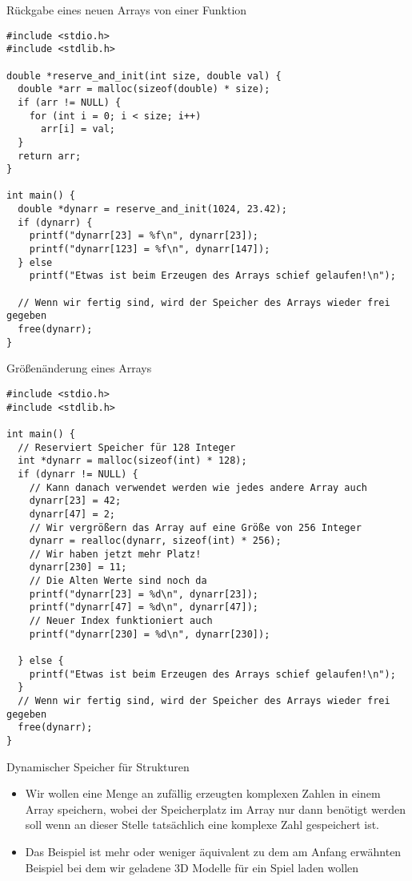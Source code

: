 \documentclass[presentation]{beamer}
\begin{document}
\begin{frame}[label={sec:orgfb5cda6},fragile]{Rückgabe eines neuen Arrays von einer Funktion}
 \begin{verbatim}
#include <stdio.h>
#include <stdlib.h>

double *reserve_and_init(int size, double val) {
  double *arr = malloc(sizeof(double) * size);
  if (arr != NULL) {
    for (int i = 0; i < size; i++)
      arr[i] = val;
  }
  return arr;
}

int main() {
  double *dynarr = reserve_and_init(1024, 23.42);
  if (dynarr) {
    printf("dynarr[23] = %f\n", dynarr[23]);
    printf("dynarr[123] = %f\n", dynarr[147]);
  } else
    printf("Etwas ist beim Erzeugen des Arrays schief gelaufen!\n");

  // Wenn wir fertig sind, wird der Speicher des Arrays wieder frei gegeben
  free(dynarr);
}
\end{verbatim}
\end{frame}

\begin{frame}[label={sec:orga4131c1},fragile]{Größenänderung eines Arrays}
 \begin{verbatim}
#include <stdio.h>
#include <stdlib.h>

int main() {
  // Reserviert Speicher für 128 Integer
  int *dynarr = malloc(sizeof(int) * 128);
  if (dynarr != NULL) {
    // Kann danach verwendet werden wie jedes andere Array auch
    dynarr[23] = 42;
    dynarr[47] = 2;
    // Wir vergrößern das Array auf eine Größe von 256 Integer
    dynarr = realloc(dynarr, sizeof(int) * 256);
    // Wir haben jetzt mehr Platz!
    dynarr[230] = 11;
    // Die Alten Werte sind noch da
    printf("dynarr[23] = %d\n", dynarr[23]);
    printf("dynarr[47] = %d\n", dynarr[47]);
    // Neuer Index funktioniert auch
    printf("dynarr[230] = %d\n", dynarr[230]);

  } else {
    printf("Etwas ist beim Erzeugen des Arrays schief gelaufen!\n");
  }
  // Wenn wir fertig sind, wird der Speicher des Arrays wieder frei gegeben
  free(dynarr);
}
\end{verbatim}
\end{frame}
\begin{frame}[label={sec:org37c76ae}]{Dynamischer Speicher für Strukturen}
\begin{itemize}
\item Wir wollen eine Menge an zufällig erzeugten komplexen Zahlen in
einem Array speichern, wobei der Speicherplatz im Array nur dann
benötigt werden soll wenn an dieser Stelle tatsächlich eine komplexe
Zahl gespeichert ist.
\item Das Beispiel ist mehr oder weniger äquivalent zu dem am Anfang
erwähnten Beispiel bei dem wir geladene 3D Modelle für ein Spiel
laden wollen
\end{itemize}
\end{frame}
\end{document}
